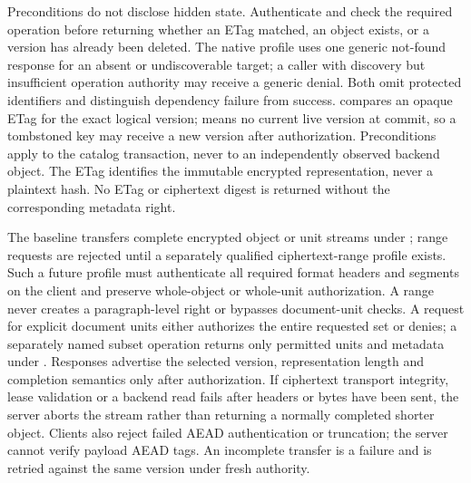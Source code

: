 Preconditions do not disclose hidden state. Authenticate and check the required operation before returning whether an ETag matched, an object exists, or a version has already been deleted. The native profile uses one generic not-found response for an absent or undiscoverable target; a caller with discovery but insufficient operation authority may receive a generic denial. Both omit protected identifiers and distinguish dependency failure from success.  compares an opaque ETag for the exact logical version;  means no current live version at commit, so a tombstoned key may receive a new version after authorization. Preconditions apply to the catalog transaction, never to an independently observed backend object. The ETag identifies the immutable encrypted representation, never a plaintext hash. No ETag or ciphertext digest is returned without the corresponding metadata right.

The baseline transfers complete encrypted object or unit streams under ; range requests are rejected until a separately qualified ciphertext-range profile exists. Such a future profile must authenticate all required format headers and segments on the client and preserve whole-object or whole-unit authorization. A range never creates a paragraph-level right or bypasses document-unit checks. A request for explicit document units either authorizes the entire requested set or denies; a separately named subset operation returns only permitted units and metadata under . Responses advertise the selected version, representation length and completion semantics only after authorization. If ciphertext transport integrity, lease validation or a backend read fails after headers or bytes have been sent, the server aborts the stream rather than returning a normally completed shorter object. Clients also reject failed AEAD authentication or truncation; the server cannot verify payload AEAD tags. An incomplete transfer is a failure and is retried against the same version under fresh authority.

